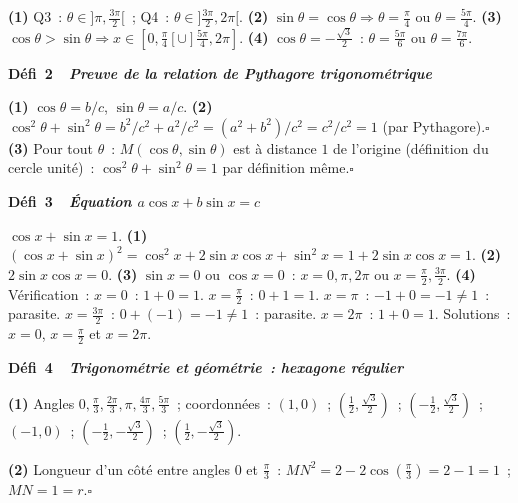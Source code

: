 \textbf{(1)} Q3~: $\theta\in]\pi,\frac{3\pi}{2}[$~; Q4~: $\theta\in]\frac{3\pi}{2},2\pi[$.
\textbf{(2)} $\sin\theta=\cos\theta\Rightarrow\theta=\frac{\pi}{4}$ ou $\theta=\frac{5\pi}{4}$.
\textbf{(3)} $\cos\theta>\sin\theta\Rightarrow x\in[0,\frac{\pi}{4}[\cup]\frac{5\pi}{4},2\pi]$.
\textbf{(4)} $\cos\theta=-\frac{\sqrt{3}}{2}$~: $\theta=\frac{5\pi}{6}$ ou $\theta=\frac{7\pi}{6}$.

\noindent{}
{\color{BO}\bfseries\small D\'efi~2~\textendash\ \textit{Preuve de la relation de Pythagore trigonom\'etrique}}
\par\smallskip

\textbf{(1)} $\cos\theta=b/c$, $\sin\theta=a/c$.
\textbf{(2)} $\cos^2\theta+\sin^2\theta=b^2/c^2+a^2/c^2=(a^2+b^2)/c^2=c^2/c^2=1$ (par Pythagore).\hfill$\square$
\textbf{(3)} Pour tout $\theta$~: $M(\cos\theta,\sin\theta)$ est \`a distance $1$ de l'origine
(d\'efinition du cercle unit\'e)~: $\cos^2\theta+\sin^2\theta=1$ par d\'efinition m\^eme.\hfill$\square$

\noindent{}
{\color{BO}\bfseries\small D\'efi~3~\textendash\ \textit{\'Equation $a\cos x+b\sin x=c$}}
\par\smallskip

$\cos x+\sin x=1$.
\textbf{(1)} $(\cos x+\sin x)^2=\cos^2x+2\sin x\cos x+\sin^2x=1+2\sin x\cos x=1$.
\textbf{(2)} $2\sin x\cos x=0$.
\textbf{(3)} $\sin x=0$ ou $\cos x=0$~:
$x=0,\pi,2\pi$ ou $x=\frac{\pi}{2},\frac{3\pi}{2}$.
\textbf{(4)} V\'erification~:
$x=0$~: $1+0=1$.\checkmark\quad
$x=\frac{\pi}{2}$~: $0+1=1$.\checkmark\quad
$x=\pi$~: $-1+0=-1\ne1$~: parasite.\quad
$x=\frac{3\pi}{2}$~: $0+(-1)=-1\ne1$~: parasite.\quad
$x=2\pi$~: $1+0=1$.\checkmark
Solutions~: $x=0$, $x=\frac{\pi}{2}$ et $x=2\pi$.

\noindent{}
{\color{BO}\bfseries\small D\'efi~4~\textendash\ \textit{Trigonom\'etrie et g\'eom\'etrie~: hexagone r\'egulier}}
\par\smallskip

\textbf{(1)} Angles $0,\frac{\pi}{3},\frac{2\pi}{3},\pi,\frac{4\pi}{3},\frac{5\pi}{3}$~; coordonn\'ees~:
$(1,0)$~; $(\frac{1}{2},\frac{\sqrt{3}}{2})$~; $(-\frac{1}{2},\frac{\sqrt{3}}{2})$~;
$(-1,0)$~; $(-\frac{1}{2},-\frac{\sqrt{3}}{2})$~; $(\frac{1}{2},-\frac{\sqrt{3}}{2})$.

\textbf{(2)} Longueur d'un c\^ot\'e entre angles $0$ et $\frac{\pi}{3}$~:
$MN^2=2-2\cos(\frac{\pi}{3})=2-1=1$~; $MN=1=r$.\hfill$\square$

